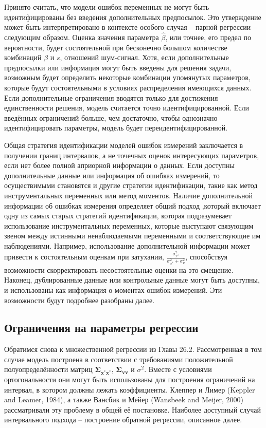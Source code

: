 Принято считать, что модели ошибок переменных не могут быть идентифицированы без введения дополнительных предпосылок. Это утверждение может быть интерпретировано в контексте особого случая – парной регрессии – следующим образом. Оценка значения параметра $\widehat{\beta}$, или точнее, его предел по вероятности, будет состоятельной при бесконечно большом количестве комбинаций $\beta$ и $s$, отношений шум-сигнал. Хотя, если дополнительные предпосылки или информация могут быть введены для решения задачи, возможным будет определить некоторые комбинации упомянутых параметров, которые будут состоятельными в условиях распределения имеющихся данных. Если дополнительные ограничения вводятся только для достижения единственности решения, модель считается точно идентифицированной. Если введённых ограничений больше, чем достаточно, чтобы однозначно идентифицировать параметры, модель будет переидентифицированной.

Общая стратегия идентификации моделей ошибок измерений заключается в получении границ интервалов, а не точечных оценок интересующих параметров, если нет более полной априорной информации о данных. Если доступны дополнительные данные или информация об ошибках измерений, то осуществимыми становятся и другие стратегии идентификации, такие как метод инструментальных переменных или метод моментов. Наличие дополнительной информации об ошибках измерения определяет общий подход ,который включает одну из самых старых стратегий идентификации, которая подразумевает использование инструментальных переменных, которые выступают связующим звеном между истинными ненаблюдаемыми переменными и соответствующие им наблюдениями. Например, использование дополнительной информации может привести к состоятельным оценкам при затухании, $\frac{\sigma^2_{x^*}}{\sigma^2_{x^*}+\sigma^2_{v}}$, способствуя возможности скорректировать несостоятельные оценки на это смещение. Наконец, дублированные данные или контрольные данные могут быть доступны, и использованы как информация о моментах ошибок измерений. Эти возможности будут подробнее разобраны далее.

\subsection{Ограничения на параметры регрессии}
 
Обратимся снова к множественной регрессии из Главы 26.2. Рассмотренная в том случае модель построена в соответствии с требованиями положительной полуопределённости матриц $\mathbf{\Sigma_{x^*x^*}}$, $\mathbf{\Sigma_{vv}}$ и $\sigma^2$. Вместе с условиями ортогональности они могут быть использованы для построения ограничений на интервал, в котором должны лежать коэффициенты. Клеппер и Лимер (Keppler and Leamer, 1984), а также Вансбик и Мейер (Wansbeek and Meijer, 2000) рассматривали эту проблему в общей её постановке. Наиболее доступный случай интервального подхода – построение обратной регрессии, описанное далее.

